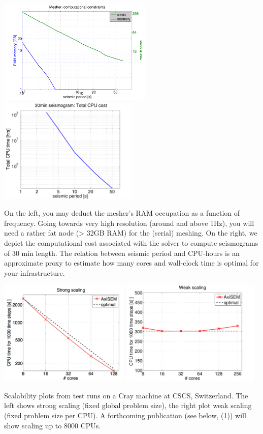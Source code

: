 \documentclass{article}
\begin{document}
    \begin{center}
    \includegraphics[height=50mm]{mesher_comp_cost.pdf}
    \hspace{5mm}
    \includegraphics[height=50mm]{solver_totalcpu.pdf}
    \end{center}
On the left, you may deduct the mesher's RAM occupation as a function
of frequency. Going towards very high resolution (around and above
1Hz), you will need a rather fat node (> 32GB RAM) for the (serial)
meshing. 
On the right, we depict the computational cost associated with the
solver to compute seismograms of 30 min length. The relation between
seismic period and CPU-hours is an approximate proxy to estimate how
many cores and wall-clock time is optimal for your infrastructure. 
    \begin{center}
    \includegraphics[height=50mm]{strong_scaling.pdf}
    \hspace{5mm}
    \includegraphics[height=50mm]{weak_scaling.pdf}
    \end{center}
Scalability plots from test runs on a Cray machine at CSCS,
Switzerland. The left shows strong scaling (fixed global problem size), the
right plot weak scaling (fixed problem size per CPU). A forthcoming
publication (see below, (1)) will show scaling up to 8000 CPUs. 
\end{document}
